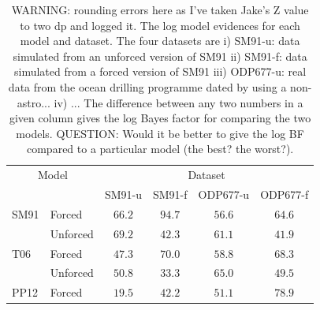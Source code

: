 \documentclass[a4paper,12pt]{article}
\begin{document}
\begin{table}[t]
\begin{center}
\begin{tabular}{ l l  c c  c c }
\toprule
\multicolumn{2}{c}{Model} & \multicolumn{4}{c}{Dataset} \\
& & SM91-u & SM91-f & ODP677-u & ODP677-f\\
\midrule
SM91 & Forced & $66.2$ & $94.7$ & $56.6$ & $64.6$ \\
 & Unforced & $69.2$ & $42.3$ & $61.1$ & $41.9$ \\
T06 & Forced & $47.3$ & $70.0$ & $58.8$ & $ 68.3$  \\
 & Unforced & $50.8$ & $33.3$ & $65.0$ & $49.5$  \\ 
PP12 & Forced & $19.5$ & $42.2$ & $51.1$ & $78.9$  \\
\bottomrule
\end{tabular}
\caption{WARNING: rounding errors here as I've taken Jake's Z value to two dp and logged it.
The log model evidences  for each model and dataset. The four datasets are i) SM91-u: data simulated from an unforced version of SM91 ii) SM91-f: data simulated from a forced version of SM91 iii) ODP677-u: real data from the ocean drilling programme dated by \cite{?} using a non-astro... iv) ...  
The difference between any two numbers in a given column gives the log Bayes factor for comparing the two models.
QUESTION: Would it be better to give the log BF compared to a particular model (the best? the worst?).
}
\label{Tab:Evidence}
\end{center}
\end{table}



%
%
%
\end{document}
